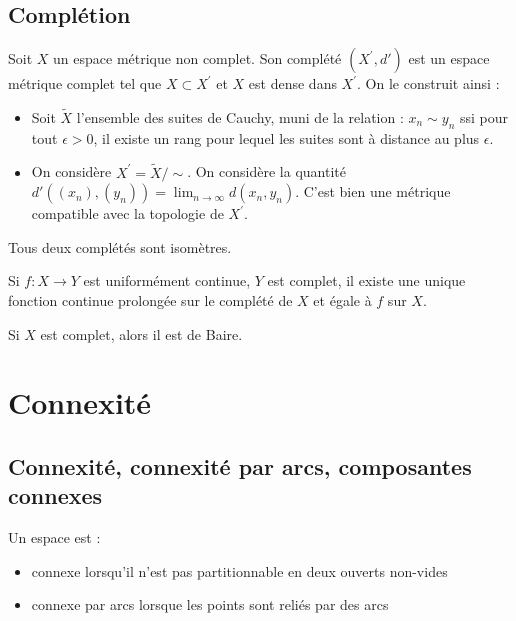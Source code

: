 \documentclass{cours}
\begin{document}
\subsection{Complétion}
\begin{definition}
    Soit $X$ un espace métrique non complet. Son complété $(X^{'}, d')$ est un espace métrique complet tel que $X \subset X^{'}$ et $X$ est dense dans $X^{'}$. On le construit ainsi :
    \begin{itemize}
        \item Soit $\tilde{X}$ l'ensemble des suites de Cauchy, muni de la relation : $x_{n} \sim y_{n}$ ssi pour tout $\epsilon > 0$, il existe un rang pour lequel les suites sont à distance au plus $\epsilon$.
        \item On considère $X^{'} = \tilde{X}/\sim$. On considère la quantité $d'((x_{n}), (y_{n})) = \lim_{n \to \infty} d(x_{n}, y_{n})$. C'est bien une métrique compatible avec la topologie de $X^{'}$.
    \end{itemize}
\end{definition}

\begin{remark}
    Tous deux complétés sont isomètres.
\end{remark}

\begin{lemma}
    Si $f : X \to Y$ est uniformément continue, $Y$ est complet, il existe une unique fonction continue prolongée sur le complété de $X$ et égale à $f$ sur $X$.
\end{lemma}

\begin{theorem}\label{thm:Bairecomplet}
    Si $X$ est complet, alors il est de Baire.    
\end{theorem}

\section{Connexité}
\subsection{Connexité, connexité par arcs, composantes connexes}
\begin{definition}
    Un espace est : 
    \begin{itemize}
        \item connexe lorsqu'il n'est pas partitionnable en deux ouverts non-vides
        \item connexe par arcs lorsque les points sont reliés par des arcs
    \end{itemize}
\end{definition}
\end{document}
